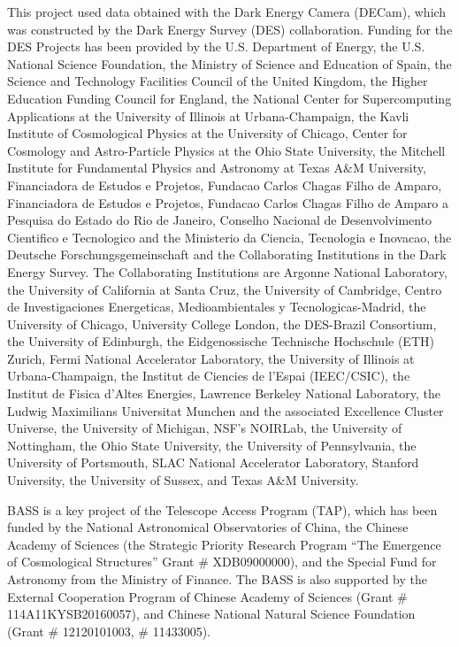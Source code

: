 \documentclass[]{polymathic}
\begin{document}
This project used data obtained with the Dark Energy Camera (DECam), which was constructed by the Dark Energy Survey (DES) collaboration. Funding for the DES Projects has been provided by the U.S. Department of Energy, the U.S. National Science Foundation, the Ministry of Science and Education of Spain, the Science and Technology Facilities Council of the United Kingdom, the Higher Education Funding Council for England, the National Center for Supercomputing Applications at the University of Illinois at Urbana-Champaign, the Kavli Institute of Cosmological Physics at the University of Chicago, Center for Cosmology and Astro-Particle Physics at the Ohio State University, the Mitchell Institute for Fundamental Physics and Astronomy at Texas A\&M University, Financiadora de Estudos e Projetos, Fundacao Carlos Chagas Filho de Amparo, Financiadora de Estudos e Projetos, Fundacao Carlos Chagas Filho de Amparo a Pesquisa do Estado do Rio de Janeiro, Conselho Nacional de Desenvolvimento Cientifico e Tecnologico and the Ministerio da Ciencia, Tecnologia e Inovacao, the Deutsche Forschungsgemeinschaft and the Collaborating Institutions in the Dark Energy Survey. The Collaborating Institutions are Argonne National Laboratory, the University of California at Santa Cruz, the University of Cambridge, Centro de Investigaciones Energeticas, Medioambientales y Tecnologicas-Madrid, the University of Chicago, University College London, the DES-Brazil Consortium, the University of Edinburgh, the Eidgenossische Technische Hochschule (ETH) Zurich, Fermi National Accelerator Laboratory, the University of Illinois at Urbana-Champaign, the Institut de Ciencies de l’Espai (IEEC/CSIC), the Institut de Fisica d’Altes Energies, Lawrence Berkeley National Laboratory, the Ludwig Maximilians Universitat Munchen and the associated Excellence Cluster Universe, the University of Michigan, NSF’s NOIRLab, the University of Nottingham, the Ohio State University, the University of Pennsylvania, the University of Portsmouth, SLAC National Accelerator Laboratory, Stanford University, the University of Sussex, and Texas A\&M University.

BASS is a key project of the Telescope Access Program (TAP), which has been funded by the National Astronomical Observatories of China, the Chinese Academy of Sciences (the Strategic Priority Research Program “The Emergence of Cosmological Structures” Grant \# XDB09000000), and the Special Fund for Astronomy from the Ministry of Finance. The BASS is also supported by the External Cooperation Program of Chinese Academy of Sciences (Grant \# 114A11KYSB20160057), and Chinese National Natural Science Foundation (Grant \# 12120101003, \# 11433005).
\end{document}
